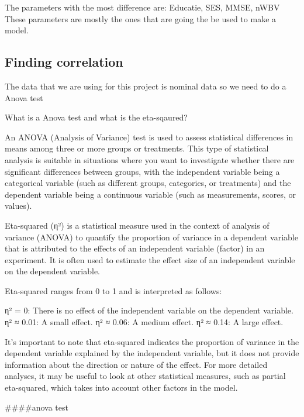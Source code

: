 \documentclass[
]{article}
\begin{document}
The parameters with the most difference are: Educatie, SES, MMSE, nWBV
These parameters are mostly the ones that are going the be used to make
a model.

\hypertarget{finding-correlation}{%
\subsection{Finding correlation}\label{finding-correlation}}

The data that we are using for this project is nominal data so we need
to do a Anova test

What is a Anova test and what is the eta-sqaured?

An ANOVA (Analysis of Variance) test is used to assess statistical
differences in means among three or more groups or treatments. This type
of statistical analysis is suitable in situations where you want to
investigate whether there are significant differences between groups,
with the independent variable being a categorical variable (such as
different groups, categories, or treatments) and the dependent variable
being a continuous variable (such as measurements, scores, or values).

Eta-squared (η²) is a statistical measure used in the context of
analysis of variance (ANOVA) to quantify the proportion of variance in a
dependent variable that is attributed to the effects of an independent
variable (factor) in an experiment. It is often used to estimate the
effect size of an independent variable on the dependent variable.

Eta-squared ranges from 0 to 1 and is interpreted as follows:

η² = 0: There is no effect of the independent variable on the dependent
variable. η² ≈ 0.01: A small effect. η² ≈ 0.06: A medium effect. η² ≈
0.14: A large effect.

It's important to note that eta-squared indicates the proportion of
variance in the dependent variable explained by the independent
variable, but it does not provide information about the direction or
nature of the effect. For more detailed analyses, it may be useful to
look at other statistical measures, such as partial eta-squared, which
takes into account other factors in the model.

\#\#\#\#anova test
\end{document}
